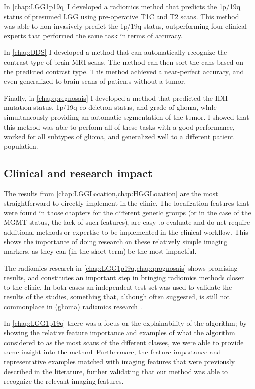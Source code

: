 In \cref{chap:LGG1p19q} I developed a radiomics method that predicts the 1p/19q status of presumed \gls{LGG} using pre-operative \gls{T1C} and \gls{T2} scans.
This method was able to non-invasively predict the 1p/19q status, outperforming four clinical experts that performed the same task in terms of accuracy.

In \cref{chap:DDS} I developed a method that can automatically recognize the contrast type of brain \gls{MRI} scans.
The method can then sort the cans based on the predicted contrast type.
This method achieved a near-perfect accuracy, and even generalized to brain scans of patients without a \gls{tumor}.

Finally, in \cref{chap:prognosais} I developed a method that predicted the \gls{IDH} mutation status, 1p/19q co-deletion status, and grade of glioma, while simultaneously providing an automatic segmentation of the \gls{tumor}.
I showed that this method was able to perform all of these tasks with a good performance, worked for all subtypes of glioma, and generalized well to a different patient population.


\subsection{Clinical and research impact}

The results from \cref{chap:LGGLocation,chap:HGGLocation} are the most straightforward to directly implement in the clinic.
The localization features that were found in those chapters for the different genetic groups (or in the case of the \gls{MGMT} status, the lack of such features), are easy to evaluate and do not require additional methods or expertise to be implemented in the clinical workflow.
This shows the importance of doing research on these relatively simple imaging markers, as they can (in the short term) be the most impactful.

The radiomics research in \cref{chap:LGG1p19q,chap:prognosais} shows promising results, and constitutes an important step in bringing radiomics methods closer to the clinic.
In both cases an independent test set was used to validate the results of the studies, something that, although often suggested, is still not commonplace in (glioma) radiomics research \autocite{gillies2016radiomics, rizzo2018radiomics, lohmann2020radiomics, yip2016applicationsradiomics}.

In \cref{chap:LGG1p19q} there was a focus on the explainability of the algorithm; by showing the relative feature importance and examples of what the algorithm considered to as the most scans of the different classes, we were able to provide some insight into the method.
Furthermore, the feature importance and representative examples matched with imaging features that were previously described in the literature, further validating that our method was able to recognize the relevant imaging features.

